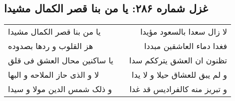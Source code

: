 \begin{center}
\section*{غزل شماره ۲۸۶: یا من بنا قصر الکمال مشیدا}
\label{sec:0286}
\begin{longtable}{l p{0.5cm} r}
یا من بنا قصر الکمال مشیدا
&&
لا زال سعدا بالسعود مؤیدا
\\
هز القلوب و ردها بصدوده
&&
فغدا دماء العاشقین مبددا
\\
یا ساکنین محال العشق فی قلق
&&
تظنون ان العشق یترککم سدا
\\
لا و الذی حاز الملاحه و البها
&&
و لم یبق للعشاق حیلا و لا یدا
\\
و ذلک شمس الدین مولا و سیدا
&&
و تبریز منه کالفرادیس قد غدا
\\
\end{longtable}
\end{center}
